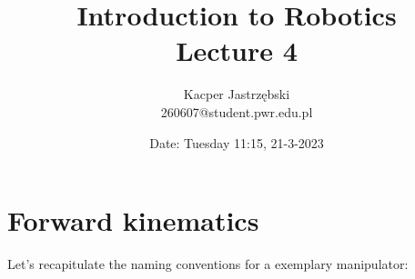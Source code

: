 \documentclass[12pt, a4paper]{extarticle}
\title{
	Introduction to Robotics \\
	\vspace{\baselineskip}
	\large
	\textbf{Lecture 4}
}
\author{
	Kacper Jastrzębski\\
	260607@student.pwr.edu.pl
}
\date{Date: Tuesday 11:15, 21-3-2023}
\begin{document}
	\maketitle
	\vspace{1.5cm}

	\tableofcontents

	\pagebreak

	\section{Forward kinematics}

	Let's recapitulate the naming conventions for a exemplary manipulator:


	\newcommand{\nvar}[2]{%
		\newlength{#1}
		\setlength{#1}{#2}
	}

	\nvar{\dg}{0.3cm}
	\def\dw{0.25}\def\dh{0.5}
	\nvar{\ddx}{1.5cm}

	\def\link{\draw [double distance=1.5mm, very thick] (0,0)--}
	\def\joint{%
		\filldraw [fill=white] (0,0) circle (5pt);
		\fill[black] circle (2pt);
	}
	\def\grip{%
		\draw[ultra thick](0cm,\dg)--(0cm,-\dg);
		\fill (0cm, 0.5\dg)+(0cm,1.5pt) -- +(0.6\dg,0cm) -- +(0pt,-1.5pt);
		\fill (0cm, -0.5\dg)+(0cm,1.5pt) -- +(0.6\dg,0cm) -- +(0pt,-1.5pt);
	}
	\def\robotbase{%
		\draw[rounded corners=8pt] (-\dw,-\dh)-- (-\dw, 0) --
		(0,\dh)--(\dw,0)--(\dw,-\dh);
		\draw (-0.5,-\dh)-- (0.5,-\dh);
		\fill[pattern=north east lines] (-0.5,-1) rectangle (0.5,-\dh);
	}

	\newcommand{\angann}[2]{%
		\begin{scope}[red]
			\draw [dashed, red] (0,0) -- (1.2\ddx,0pt);
			\draw [->, shorten >=3.5pt] (\ddx,0pt) arc (0:#1:\ddx);
			\node at (#1/2-2:\ddx+8pt) {#2};
		\end{scope}
	}

	\newcommand{\lineann}[4][0.5]{%
		\begin{scope}[rotate=#2, blue,inner sep=2pt]
			\draw[dashed, blue!40] (0,0) -- +(0,#1)
			node [coordinate, near end] (a) {};
			\draw[dashed, blue!40] (#3,0) -- +(0,#1)
			node [coordinate, near end] (b) {};
			\draw[|<->|] (a) -- node[fill=white] {#4} (b);
		\end{scope}
	}
\end{document}
